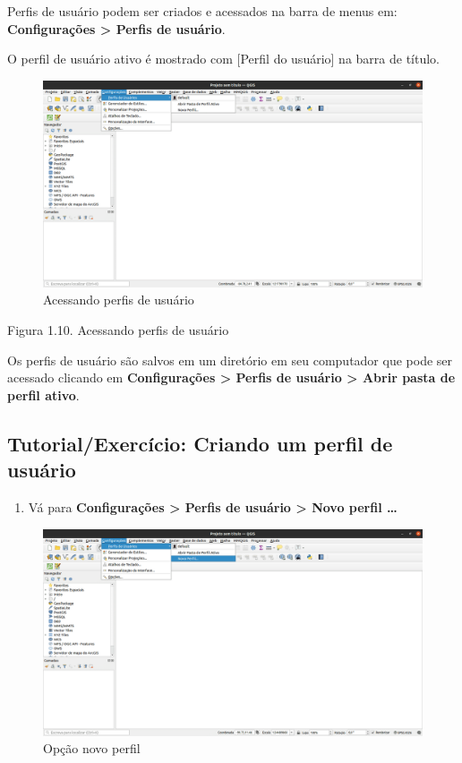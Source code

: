 \documentclass[
]{krantz}
\providecommand{\tightlist}{%
  \setlength{\itemsep}{0pt}\setlength{\parskip}{0pt}}
\begin{document}
Perfis de usuário podem ser criados e acessados na barra de menus em: \textbf{Configurações \textgreater{} Perfis de usuário}.

O perfil de usuário ativo é mostrado com {[}Perfil do usuário{]} na barra de título.

\begin{figure}
\centering
\includegraphics{media/modulo1/user-profiles-1.png}
\caption{Acessando perfis de usuário}
\end{figure}

Figura 1.10. Acessando perfis de usuário

Os perfis de usuário são salvos em um diretório em seu computador que pode ser acessado clicando em \textbf{Configurações \textgreater{} Perfis de usuário \textgreater{} Abrir pasta de perfil ativo}.

\hypertarget{tutorialexercuxedcio-criando-um-perfil-de-usuuxe1rio}{%
\subsection{Tutorial/Exercício: Criando um perfil de usuário}\label{tutorialexercuxedcio-criando-um-perfil-de-usuuxe1rio}}

\begin{enumerate}
\def\labelenumi{\arabic{enumi}.}
\tightlist
\item
  Vá para \textbf{Configurações \textgreater{} Perfis de usuário \textgreater{} Novo perfil \ldots{}}
\end{enumerate}

\begin{figure}
\centering
\includegraphics{media/modulo1/user-profiles-2.png}
\caption{Opção novo perfil}
\end{figure}
\end{document}
